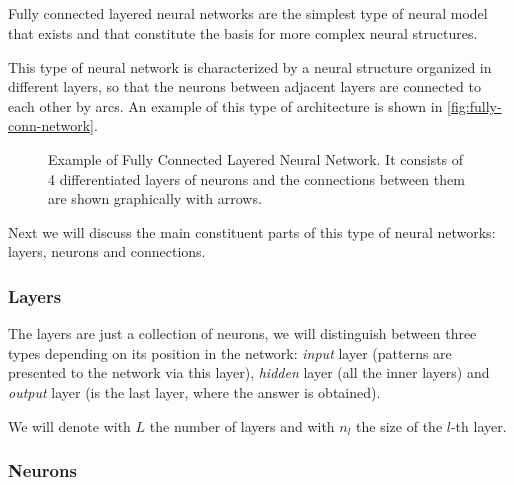\subsection{}\label{sec:fnn}

Fully connected layered neural networks are the simplest type of neural model
that exists and that constitute the basis for more complex neural structures.

This type of neural network is characterized by a neural structure organized in
different layers, so that the neurons between adjacent layers are connected to
each other by arcs. An example of this type of architecture is shown in
\vref{fig:fully-conn-network}.

\begin{figure}[ht]
  \centering
  
  \caption[Fully Connected Neural Network topology]{Example of Fully Connected
    Layered Neural Network. It consists of 4 differentiated layers of neurons
    and the connections between them are shown graphically with arrows.}
  \label{fig:fully-conn-network}
\end{figure}

Next we will discuss the main constituent parts of this type of neural
networks: layers, neurons and connections.

\subsubsection{Layers}

The layers are just a collection of neurons, we will distinguish between three
types depending on its position in the network: \emph{input} layer (patterns
are presented to the network via this layer), \emph{hidden} layer (all the
inner layers) and \emph{output} layer (is the last layer, where the answer is
obtained).

We will denote with \(L\) the number of layers and with \(n_l\) the size of the
\(l\)-th layer.

\subsubsection{Neurons}

